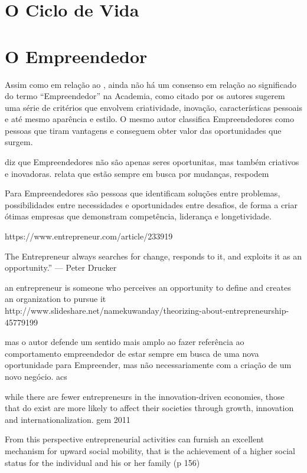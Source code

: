 \section{O Ciclo de Vida}
\label{section:o_ciclo_de_vida}





\section{O Empreendedor}
\label{section:o_empreendedor}

Assim como em relação ao \cite{section:o_empreendedorismo}, ainda não há um consenso em relação ao significado do termo ``Empreendedor'' na Academia, como citado por \cite{Fernald2005} os autores sugerem uma série de critérios que envolvem criatividade, inovação, características pessoais e até mesmo aparência e estilo. O mesmo autor classifica Empreendedores como pessoas que tiram vantagens e conseguem obter valor das oportunidades que surgem.

\cite{Stevenson1985} diz que Empreendedores não são apenas seres oportunitas, mas também criativos e inovadoras. \cite{Drucker2006} relata que estão sempre em busca por mudanças, respodem 

Para \cite{Byers2014} Empreendedores são pessoas que identificam soluções entre problemas, possibilidades entre necessidades e oportunidades entre desafios, de forma a criar ótimas empresas que demonstram competência, liderança e longetividade.

https://www.entrepreneur.com/article/233919

The Entrepreneur always searches for change, responds to it, and exploits it as an opportunity.”  — Peter Drucker

an entrepreneur is someone who perceives an opportunity to define and creates an organization to pursue it http://www.slideshare.net/namekuwanday/theorizing-about-entrepreneurship-45779199

 mas o autor defende um sentido mais amplo ao fazer referência ao comportamento empreendedor de estar sempre em busca de uma nova oportunidade para Empreender, mas não necessariamente com a criação de um novo negócio. acs

while there are fewer
entrepreneurs in the innovation-driven economies, those
that do exist are more likely to affect their societies
through growth, innovation and internationalization. gem 2011

 From this
perspective entrepreneurial activities can furnish an excellent mechanism for upward
social mobility, that is the achievement of a higher social status for the individual and his
or her family (p 156)

